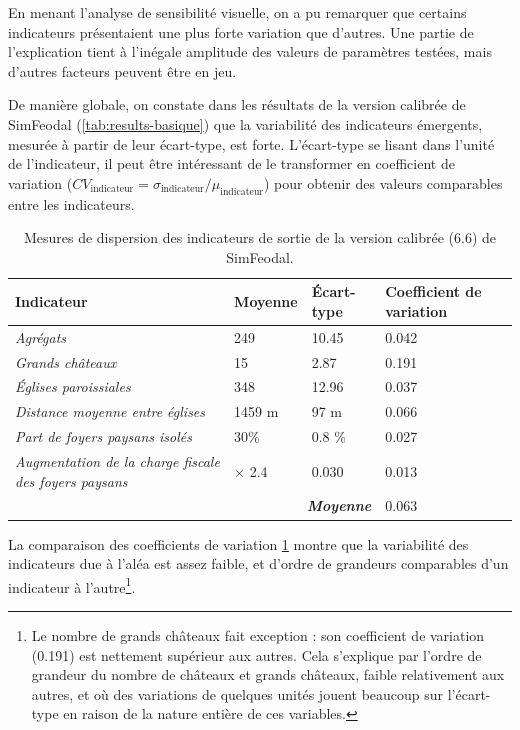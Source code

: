 En menant l'analyse de sensibilité visuelle, on a pu remarquer que certains indicateurs présentaient une plus forte variation que d'autres.
Une partie de l'explication tient à l'inégale amplitude des valeurs de paramètres testées, mais d'autres facteurs peuvent être en jeu.

De manière globale, on constate dans les résultats de la version calibrée de SimFeodal (\cref{tab:results-basique}) que la variabilité des indicateurs émergents, mesurée à partir de leur écart-type, est forte.
L'écart-type se lisant dans l'unité de l'indicateur, il peut être intéressant de le transformer en coefficient de variation ($CV_{\text{indicateur}} = \sigma_{\text{indicateur}}  /  \mu_{\text{indicateur}}$) pour obtenir des valeurs comparables entre les indicateurs. 


\begin{table}[H]
{\renewcommand{\arraystretch}{1.1}%
	\begin{tabular}{|p{5cm}|p{2.5cm}|p{2.5cm}|p{2.5cm}|}
\hline
\textbf{Indicateur} & \textbf{Moyenne} & \textbf{Écart-type} & \textbf{Coefficient de variation} \\
\hline
\textit{Agrégats} & 249 & 10.45 & 0.042\\
\hline
\textit{Grands châteaux} & 15 & 2.87 & 0.191\\
\hline
\textit{Églises paroissiales} & 348 & 12.96 & 0.037\\
\hline
\textit{Distance moyenne entre églises} & 1459 m & 97 m & 0.066\\
\hline
\textit{Part de foyers paysans isolés} & 30\% & 0.8 \% & 0.027\\
\hline
\textit{Augmentation de la charge fiscale des foyers paysans} & $\times$ 2.4 & 0.030 & 0.013\\
\hline
\multicolumn{3}{r|}{\textbf{\textit{Moyenne}}} & 0.063\\
\cline{4-4}
	\end{tabular}
}
\caption{Mesures de dispersion des indicateurs de sortie de la version calibrée (6.6) de SimFeodal.}
\label{tab:variabilite-indicateurs}
\end{table}

La comparaison des coefficients de variation \cref{tab:variabilite-indicateurs} montre que la variabilité des indicateurs due à l'aléa est assez faible, et d'ordre de grandeurs comparables d'un indicateur à l'autre\footnote{
	Le nombre de grands châteaux fait exception : son coefficient de variation (0.191) est nettement supérieur aux autres.
	Cela s'explique par l'ordre de grandeur du nombre de châteaux et grands châteaux, faible relativement aux autres, et où des variations de quelques unités jouent beaucoup sur l'écart-type en raison de la nature entière de ces variables.
}.

